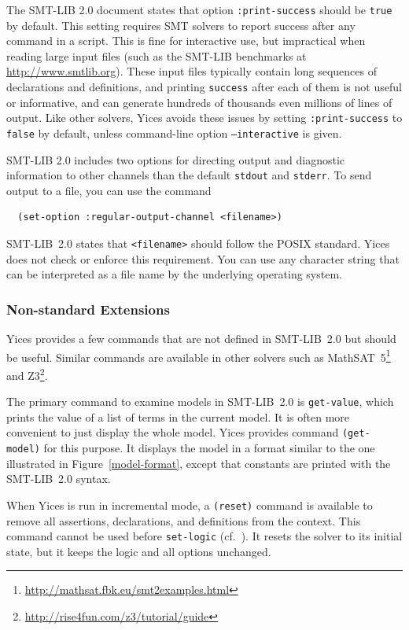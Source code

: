 \documentclass[11pt,twoside,fleqn,openright,titlepage]{cslreport}
\begin{document}
The SMT-LIB 2.0 document states that option \texttt{:print-success}
should be \texttt{true} by default. This setting requires SMT solvers
to report success after any command in a script. This is fine for
interactive use, but impractical when reading large input files (such
as the SMT-LIB benchmarks at \url{http://www.smtlib.org}). These
input files typically contain long sequences of declarations and
definitions, and printing \texttt{success} after each of them is not
useful or informative, and can generate hundreds of thousands even
millions of lines of output.  Like other solvers, Yices avoids these
issues by setting \texttt{:print-success} to \texttt{false} by default,
unless command-line option \texttt{--interactive} is given.


\medskip\noindent SMT-LIB 2.0 includes two options for directing
output and diagnostic information to other channels than the default
\texttt{stdout} and \texttt{stderr}. To send output to a file, you can
use the command
\begin{small}
\begin{verbatim}
  (set-option :regular-output-channel <filename>)
\end{verbatim}
\end{small}
SMT-LIB~2.0 states that \texttt{<filename>} should follow the POSIX
standard. Yices does not check or enforce this requirement. You can
use any character string that can be interpreted as a file name by the
underlying operating system.


\subsubsection*{Non-standard Extensions}

Yices provides a few commands that are not defined in SMT-LIB~2.0 but
should be useful. Similar commands are available in other solvers such
as MathSAT~5\footnote{\url{http://mathsat.fbk.eu/smt2examples.html}} and
Z3\footnote{\url{http://rise4fun.com/z3/tutorial/guide}}.

\medskip\noindent The primary command to examine models in SMT-LIB~2.0
is \texttt{get-value}, which prints the value of a list of terms in
the current model. It is often more convenient to just display the
whole model.  Yices provides command \texttt{(get-model)} for this
purpose. It displays the model in a format similar to the one
illustrated in Figure~\ref{model-format}, except that constants are
printed with the SMT-LIB~2.0 syntax.

\medskip\noindent When Yices is run in incremental mode, a
\texttt{(reset)} command is available to remove all assertions,
declarations, and definitions from the context. This command cannot be
used before \texttt{set-logic} (cf.~\cite{SMTLIB20:2012}). It resets
the solver to its initial state, but it keeps the logic and all
options unchanged.
\end{document}

